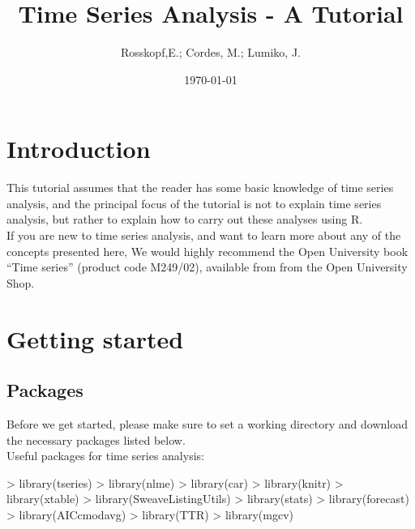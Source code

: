 \documentclass[11pt, a4paper]{article} %
\begin{document}

\title{Time Series Analysis - A Tutorial}
\author{Rosskopf,E.; Cordes, M.; Lumiko, J.}
\date{\today} %
\maketitle
{}
\tableofcontents
\pagebreak


\section{Introduction}
This tutorial assumes that the reader has some basic knowledge of time series analysis, and the principal focus of the tutorial is not to explain time series analysis, but rather to explain how to carry out these analyses using R.\\
\noindent
If you are new to time series analysis, and want to learn more about any of the concepts presented here, We would highly recommend the Open University book “Time series” (product code M249/02), available from from the Open University Shop.\\
\section{Getting started}%
\subsection{Packages}
Before we get started, please make sure to set a working directory and download the necessary packages listed below.\\
\noindent Useful packages for time series analysis:
\begin{Schunk}
\begin{Sinput}
> library(tseries)
> library(nlme)
> library(car)
> library(knitr)
> library(xtable)
> library(SweaveListingUtils)
> library(stats)
> library(forecast)
> library(AICcmodavg)
> library(TTR)
> library(mgcv)
\end{Sinput}
\end{Schunk}
\end{document}
